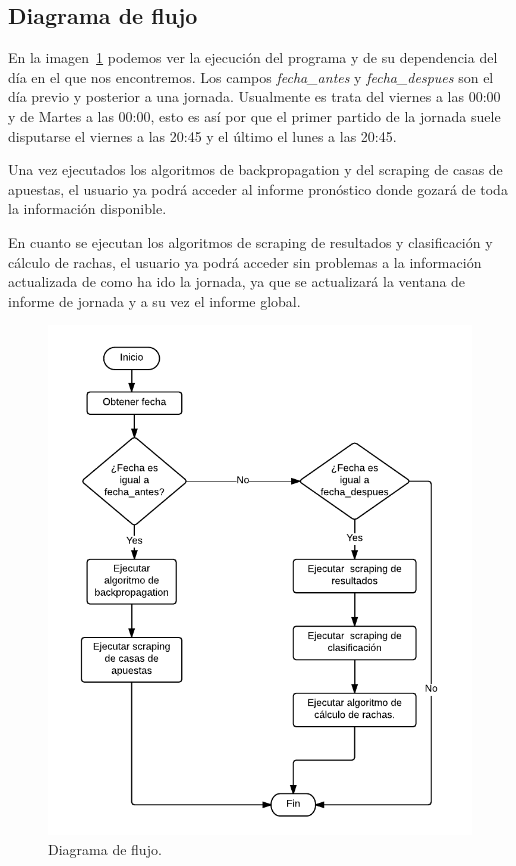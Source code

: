 \subsection{Diagrama de flujo}
En la imagen~\ref{fig:DiagFluj} podemos ver la ejecución del programa y de su dependencia del día en el que nos encontremos. Los campos \textit{fecha\_antes} y \textit{fecha\_despues} son el día previo y posterior a una jornada. Usualmente es trata del viernes a las 00:00 y  de Martes a las 00:00, esto es así por que el primer partido de la jornada suele disputarse el viernes a las 20:45 y el último el lunes a las 20:45.

Una vez ejecutados los algoritmos de backpropagation y del scraping de casas de apuestas, el usuario ya podrá acceder al informe pronóstico donde gozará de toda la información disponible.

En cuanto se ejecutan los algoritmos de scraping de resultados y clasificación y cálculo de rachas, el usuario ya podrá acceder sin problemas a la información actualizada de como ha ido la jornada, ya que se actualizará la ventana de informe de jornada y a su vez el informe global.
\begin{figure}
\centering
\includegraphics[width=.9\textwidth]{img/diagrama_flujo}
\caption[Diagrama de flujo]{Diagrama de flujo.}
\label{fig:DiagFluj}
\end{figure}

